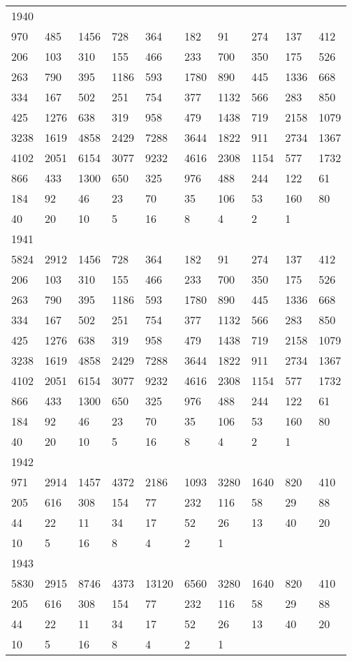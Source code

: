 \begin{longtable}{*{10}{l}}
1940&&&&&&&&&\\
970& 485& 1456& 728& 364& 182& 91& 274& 137& 412\\
206& 103& 310& 155& 466& 233& 700& 350& 175& 526\\
263& 790& 395& 1186& 593& 1780& 890& 445& 1336& 668\\
334& 167& 502& 251& 754& 377& 1132& 566& 283& 850\\
425& 1276& 638& 319& 958& 479& 1438& 719& 2158& 1079\\
3238& 1619& 4858& 2429& 7288& 3644& 1822& 911& 2734& 1367\\
4102& 2051& 6154& 3077& 9232& 4616& 2308& 1154& 577& 1732\\
866& 433& 1300& 650& 325& 976& 488& 244& 122& 61\\
184& 92& 46& 23& 70& 35& 106& 53& 160& 80\\
40& 20& 10& 5& 16& 8& 4& 2& 1& \\

1941&&&&&&&&&\\
5824& 2912& 1456& 728& 364& 182& 91& 274& 137& 412\\
206& 103& 310& 155& 466& 233& 700& 350& 175& 526\\
263& 790& 395& 1186& 593& 1780& 890& 445& 1336& 668\\
334& 167& 502& 251& 754& 377& 1132& 566& 283& 850\\
425& 1276& 638& 319& 958& 479& 1438& 719& 2158& 1079\\
3238& 1619& 4858& 2429& 7288& 3644& 1822& 911& 2734& 1367\\
4102& 2051& 6154& 3077& 9232& 4616& 2308& 1154& 577& 1732\\
866& 433& 1300& 650& 325& 976& 488& 244& 122& 61\\
184& 92& 46& 23& 70& 35& 106& 53& 160& 80\\
40& 20& 10& 5& 16& 8& 4& 2& 1& \\

1942&&&&&&&&&\\
971& 2914& 1457& 4372& 2186& 1093& 3280& 1640& 820& 410\\
205& 616& 308& 154& 77& 232& 116& 58& 29& 88\\
44& 22& 11& 34& 17& 52& 26& 13& 40& 20\\
10& 5& 16& 8& 4& 2& 1& \\

1943&&&&&&&&&\\
5830& 2915& 8746& 4373& 13120& 6560& 3280& 1640& 820& 410\\
205& 616& 308& 154& 77& 232& 116& 58& 29& 88\\
44& 22& 11& 34& 17& 52& 26& 13& 40& 20\\
10& 5& 16& 8& 4& 2& 1& \\


\end{longtable}
